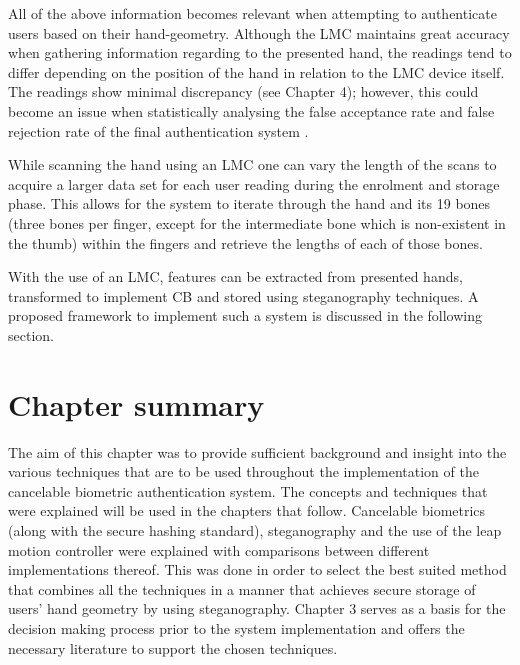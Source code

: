 All of the above information becomes relevant when attempting to authenticate users based on their hand-geometry. Although the LMC maintains great accuracy when gathering information regarding to the presented hand, the readings tend to differ depending on the position of the hand in relation to the LMC device itself. The readings show minimal discrepancy (see Chapter 4); however, this could become an issue when statistically analysing the false acceptance rate and false rejection rate of the final authentication system \citep{Nagar2009}.

While scanning the hand using an LMC one can vary the length of the scans to acquire a larger data set for each user reading during the enrolment and storage phase. This allows for the system to iterate through the hand and its 19 bones (three bones per finger, except for the intermediate bone which is non-existent in the thumb) within the fingers and retrieve the lengths of each of those bones.

With the use of an LMC, features can be extracted from presented hands, transformed to implement CB and stored using steganography techniques. A proposed framework to implement such a system is discussed in the following section.


\section[Chapter summary]{Chapter summary}

The aim of this chapter was to provide sufficient background and insight into the various techniques that are to be used throughout the implementation of the cancelable biometric authentication system. The concepts and techniques that were explained will be used in the chapters that follow. Cancelable biometrics (along with the secure hashing standard), steganography and the use of the leap motion controller were explained with comparisons between different implementations thereof. This was done in order to select the best suited method that combines all the techniques in a manner that achieves secure storage of users’ hand geometry by using steganography.
Chapter 3 serves as a basis for the decision making process prior to the system implementation and offers the necessary literature to support the chosen techniques.


